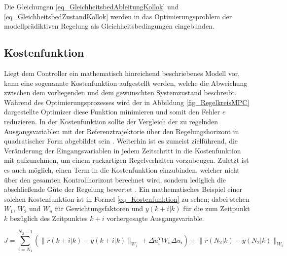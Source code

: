 Die Gleichungen \ref{eq_GleichheitsbedAbleitungKollok} und \ref{eq_GleichheitsbedZustandKollok} werden in das Optimierungsproblem der modellprädiktiven Regelung als Gleichheitsbedingungen eingebunden.


\subsection{Kostenfunktion} \label{subsec_Kostenfunktion}
Liegt dem Controller ein mathematisch hinreichend beschriebenes Modell vor, kann eine sogenannte Kostenfunktion aufgestellt werden, welche die Abweichung zwischen dem vorliegenden und dem gewünschten Systemzustand beschreibt.
Während des Optimierungsprozesses wird der in Abbildung \ref{fig_RegelkreisMPC} dargestellte Optimizer diese Funktion minimieren und somit den Fehler $e$ reduzieren.
In der Kostenfunktion sollte der Vergleich der zu regelnden Ausgangsvariablen mit der Referenztrajektorie über den Regelungshorizont in quadratischer Form abgebildet sein \cite[S.24]{Diehl}\cite[S.3]{Schwenzer}.
Weiterhin ist es zumeist zielführend, die Veränderung der Eingangsvariablen in jedem Zeitschritt in die Kostenfunktion mit aufzunehmen, um einem ruckartigen Regelverhalten vorzubeugen.
Zuletzt ist es auch möglich, einen Term in die Kostenfunktion einzubinden, welcher nicht über den gesamten Kontrollhorizont berechnet wird, sondern lediglich die abschließende Güte der Regelung bewertet \cite[S.24]{Diehl}.
Ein mathematisches Beispiel einer solchen Kostenfunktion ist in Formel \ref{eq_Kostenfunktion} zu sehen; dabei stehen $W_1$, $W_2$ und $W_u$ für Gewichtungsfaktoren und $y(k+i\rvert k)$ für die zum Zeitpunkt $k$ bezüglich des Zeitpunktes $k+i$ vorhergesagte Ausgangsvariable. \cite[S.3]{Schwenzer}

\begin{equation} \label{eq_Kostenfunktion}
    J = \sum_{i=N_1}^{N_2-1}\left(\lVert r(k+i\rvert k)-y(k+i\rvert k)\rVert_{W_1} + \Delta u_i^T W_u \Delta u_i\right) + \lVert r(N_2\rvert k)-y(N_2\rvert k)\rVert_{W_2}
\end{equation}


